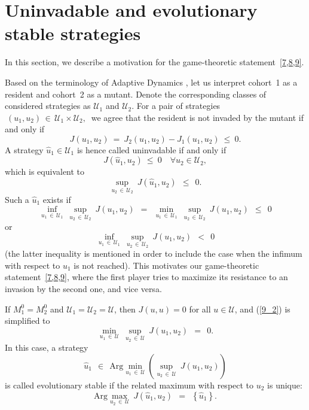 \documentclass[a4paper,12pt]{article}
\begin{document}
\section{Uninvadable and evolutionary stable strategies}

In this section, we describe a motivation for the game-theoretic statement~{\rm \cref{7,8,9}}.

Based on the terminology of Adaptive Dynamics \cite{DercoleRinaldi2008}, let us interpret cohort~{\rm 1} as a resident and
cohort~{\rm 2} as a mutant. Denote the corresponding classes of considered strategies as $ \mathcal{U}_1 $ and $ \mathcal{U}_2 $. For
a pair of strategies $ \: (u_1, u_2) \, \in \, \mathcal{U}_1 \times \mathcal{U}_2, \: $ we agree that the resident is
not invaded by the mutant if and only if
$$
J(u_1, u_2) \: = \: J_2(u_1, u_2) - J_1(u_1, u_2) \: \leqslant \: 0.
$$
A strategy $ \hat{u}_1 \in \mathcal{U}_1 $ is hence called uninvadable if and only if
$$
J \left( \hat{u}_1, u_2 \right) \: \leqslant \: 0 \quad \forall u_2 \in \mathcal{U}_2,
$$
which is equivalent to
$$
\sup_{u_2 \, \in \, \mathcal{U}_2} \: J \left( \hat{u}_1, u_2 \right) \:\: \leqslant \:\: 0.
$$
Such a $ \hat{u}_1 $ exists if
\begin{equation}
\inf_{u_1 \, \in \, \mathcal{U}_1} \: \sup_{u_2 \, \in \, \mathcal{U}_2} \: J(u_1, u_2) \:\: = \:\:
\min_{u_1 \, \in \, \mathcal{U}_1} \: \sup_{u_2 \, \in \, \mathcal{U}_2} \: J(u_1, u_2) \:\: \leqslant \:\: 0  \label{9_2}
\end{equation}
or
\begin{equation}
\inf_{u_1 \, \in \, \mathcal{U}_1} \: \sup_{u_2 \, \in \, \mathcal{U}_2} \: J(u_1, u_2) \:\: < \:\: 0  \label{9_4}
\end{equation}
(the latter inequality is mentioned in order to include the case when the infimum with respect to $ u_1 $ is not reached).
This motivates our game-theoretic statement~{\rm \cref{7,8,9},} where the first player tries to maximize its
resistance to an invasion by the second one{\rm ,} and vice versa.

If $ M_1^0 = M_2^0 $ and $ \mathcal{U}_1 = \mathcal{U}_2 = \mathcal{U} ${\rm ,} then $ J(u, u) = 0 $ for all $ u \in \mathcal{U} ${\rm ,}
and {\rm (\ref{9_2})} is simplified to
\begin{equation}
\min_{u_1 \, \in \, \mathcal{U}} \: \sup_{u_2 \, \in \, \mathcal{U}} \: J(u_1, u_2) \:\: = \:\: 0.  \label{9_3}
\end{equation}
In this case{\rm ,} a strategy
$$
\hat{u}_1 \:\: \in \:\: \mathrm{Arg} \min_{u_1 \, \in \, \mathcal{U}} \left( \sup_{u_2 \, \in \, \mathcal{U}} \: J(u_1, u_2) \right)
$$
is called evolutionary stable if the related maximum with respect to $ u_2 $ is unique{\rm :}
$$
\mathrm{Arg} \max_{u_2 \, \in \, \mathcal{U}} \: J \left( \hat{u}_1, u_2 \right) \:\: = \:\: \left\{ \hat{u}_1 \right\}.
$$
\end{document}
